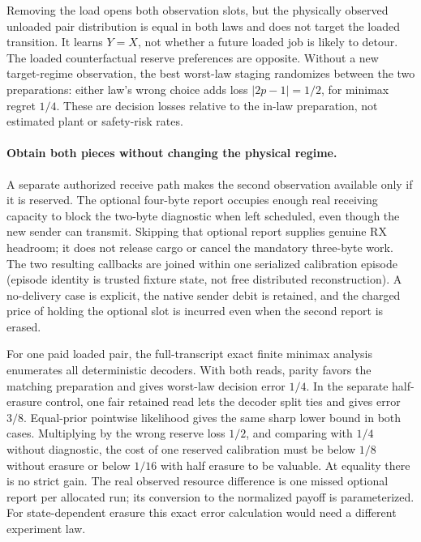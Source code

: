 \documentclass{article}
\begin{document}
Removing the load opens both observation slots, but the physically
observed unloaded pair distribution is equal in both laws and
does not target the loaded transition. It learns $Y=X$, not
whether a future loaded job is likely to detour. The loaded
counterfactual reserve preferences are opposite. Without a new
target-regime observation, the best worst-law staging
randomizes between the two preparations: either law's wrong
choice adds loss $|2p-1|=1/2$, for minimax regret $1/4$.
These are decision losses relative to the in-law preparation,
not estimated plant or safety-risk rates.

\paragraph{Obtain both pieces without changing the physical regime.}
A separate authorized receive path makes the second observation
available only if it is reserved. The optional four-byte report
occupies enough real receiving capacity to block the two-byte
diagnostic when left scheduled, even though the new sender can
transmit. Skipping that optional report supplies genuine RX
headroom; it does not release cargo or cancel the mandatory
three-byte work. The two resulting callbacks are joined within
one serialized calibration episode (episode identity is trusted
fixture state, not free distributed reconstruction). A no-delivery
case is explicit, the native sender debit is retained, and the
charged price of holding the optional slot is incurred even
when the second report is erased.

For one paid loaded pair, the full-transcript exact finite
minimax analysis enumerates all deterministic decoders. With
both reads, parity favors the matching preparation and gives
worst-law decision error $1/4$. In the separate half-erasure
control, one fair retained read lets the decoder split ties and
gives error $3/8$. Equal-prior pointwise likelihood gives the
same sharp lower bound in both cases. Multiplying by the wrong
reserve loss $1/2$, and comparing with $1/4$ without diagnostic,
the cost of one reserved calibration must be below $1/8$
without erasure or below $1/16$ with half erasure to be valuable.
At equality there is no strict gain. The real observed resource
difference is one missed optional report per allocated run;
its conversion to the normalized payoff is parameterized.
For state-dependent erasure this exact error calculation
would need a different experiment law.
\end{document}
